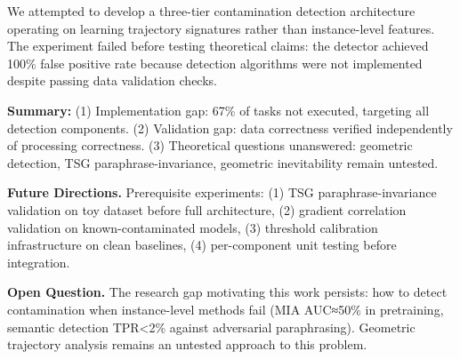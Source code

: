 
We attempted to develop a three-tier contamination detection architecture operating on learning trajectory signatures rather than instance-level features. The experiment failed before testing theoretical claims: the detector achieved 100\% false positive rate because detection algorithms were not implemented despite passing data validation checks.

\textbf{Summary:} (1) Implementation gap: 67\% of tasks not executed, targeting all detection components. (2) Validation gap: data correctness verified independently of processing correctness. (3) Theoretical questions unanswered: geometric detection, TSG paraphrase-invariance, geometric inevitability remain untested.

\textbf{Future Directions.} Prerequisite experiments: (1) TSG paraphrase-invariance validation on toy dataset before full architecture, (2) gradient correlation validation on known-contaminated models, (3) threshold calibration infrastructure on clean baselines, (4) per-component unit testing before integration.

\textbf{Open Question.} The research gap motivating this work persists: how to detect contamination when instance-level methods fail (MIA AUC≈50\% in pretraining, semantic detection TPR<2\% against adversarial paraphrasing). Geometric trajectory analysis remains an untested approach to this problem.

